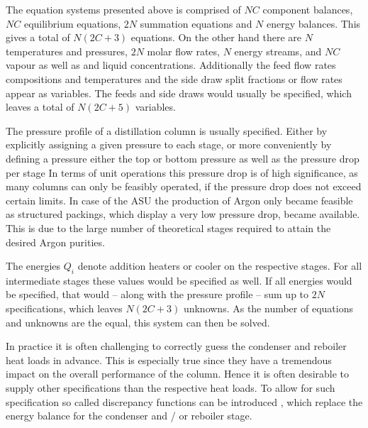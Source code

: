         The equation systems presented above is comprised of $NC$ component balances, $NC$ equilibrium
        equations, $2N$ summation equations and $N$ energy balances. This gives a total of $N (2C + 3)$
        equations. On the other hand there are $N$ temperatures and pressures, $2N$ molar flow rates,
        $N$ energy streams, and $NC$ vapour as well as and liquid concentrations. Additionally the feed flow rates
        compositions and temperatures and the side draw split fractions or flow rates appear as variables. The
        feeds and side draws would usually be specified, which leaves a total of $N (2C + 5)$ variables.

        The pressure profile of a distillation column is usually specified. Either by explicitly
        assigning a given pressure to each stage, or more conveniently by defining a pressure
        either the top or bottom pressure as well as the pressure drop per stage
        In terms of unit operations this pressure drop is of high significance,
        as many columns can only be feasibly operated, if the pressure drop does not exceed certain
        limits. In case of the ASU the production of Argon only became feasible as structured
        packings, which display a very low pressure drop, became available. This is due to the large
        number of theoretical stages required to attain the desired Argon purities.

        The energies $Q_i$ denote addition heaters or cooler on the respective stages. For all
        intermediate stages these values would be specified as well. If all energies would be
        specified, that would -- along with the pressure profile -- sum up to $2N$ specifications,
        which leaves $N (2C + 3)$ unknowns. As the number of equations and unknowns are the equal,
        this system can then be solved.

        In practice it is often challenging to correctly guess the condenser and reboiler heat loads in
        advance. This is especially true since they have a tremendous impact on the overall performance
        of the column. Hence it is often desirable to supply other specifications than the respective
        heat loads. To allow for such specification so called discrepancy functions can be introduced
        \cite{Henley.op.2011}, which replace the energy balance for the condenser and / or reboiler stage.

